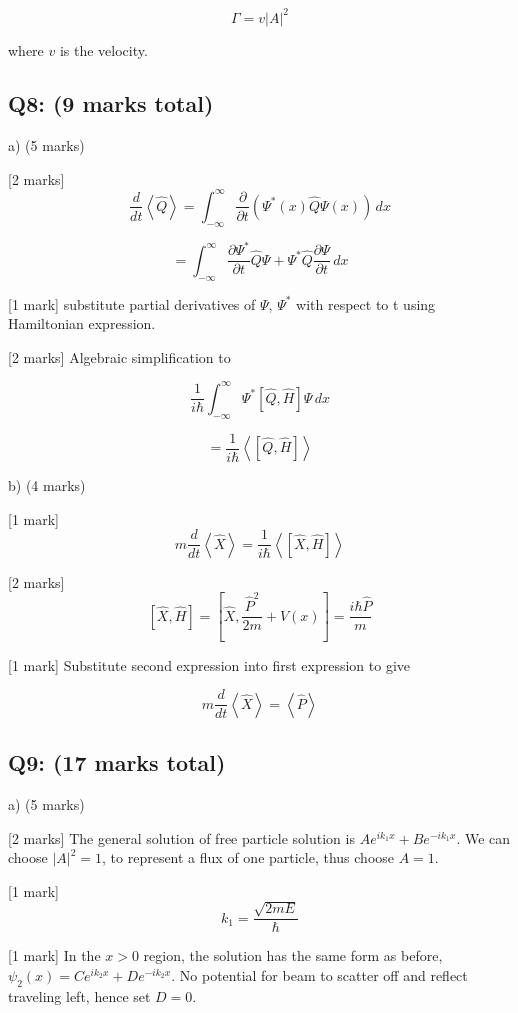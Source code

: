 \documentclass[a4paper,11pt]{article}
\begin{document}
 \[\Gamma = v \left|A \right|^{2} \]  

where \(v\) is the velocity. 

\subsection*{Q8: (9 marks total) }

a) (5 marks)

[2 marks] \[ \frac{d}{dt} \left< \hat{Q} \right> = \int_{-\infty}^{\infty} \frac{\partial}{\partial t} \left( \Psi^{*}(x) \hat{Q} \Psi(x) \right) \, dx \]

\[ = \int_{-\infty}^{\infty} \frac{\partial \Psi^{*}}{\partial t}\hat{Q}\Psi + \Psi^{*}\hat{Q}\frac{\partial \Psi}{\partial t} \, dx \]

[1 mark] substitute partial derivatives of \(\Psi\), \(\Psi^{*}\) with respect to t using Hamiltonian expression.

[2 marks] Algebraic simplification to 

\[ \frac{1}{i\hbar} \int_{-\infty}^{\infty} \Psi^{*} \left [ \hat{Q}, \hat{H} \right ] \Psi \, dx \]

\[ = \frac{1}{i\hbar} \left<  \left [ \hat{Q}, \hat{H} \right ] \right> \]

b) (4 marks)

[1 mark]\[m \frac{d}{dt}  \left<\hat{X}\right> = \frac{1}{i\hbar}\left< \left[ \hat{X}, \hat{H} \right] \right> \] 

[2 marks] \[\left[ \hat{X}, \hat{H}\right] = \left[ \hat{X}, \frac{\hat{P}^{2}}{2m} + V(x)\right] = \frac{i\hbar \hat{P}}{m} \]

[1 mark] Substitute second expression into first expression to give 

\[m \frac{d}{dt}\left<\hat{X}\right> =  \left<\hat{P}\right> \]

\subsection*{Q9: (17 marks total) }

a) (5 marks)

[2 marks] The general solution of free particle solution is \( Ae^{ik_{1}x} + Be^{-ik_{1}x} \). We can choose \( |A|^{2} = 1 \), to represent a flux of one particle, thus choose \( A = 1 \). 

[1 mark] \[ k_1 = \frac{\sqrt{2mE}}{\hbar} \]

[1 mark] In the \( x > 0 \) region, the solution has the same form as before, \( \psi_{2}(x) = Ce^{ik_{2}x} + De^{-ik_{2}x} \). No potential for beam to scatter off and reflect traveling left, hence set \( D = 0 \). 
\end{document}
